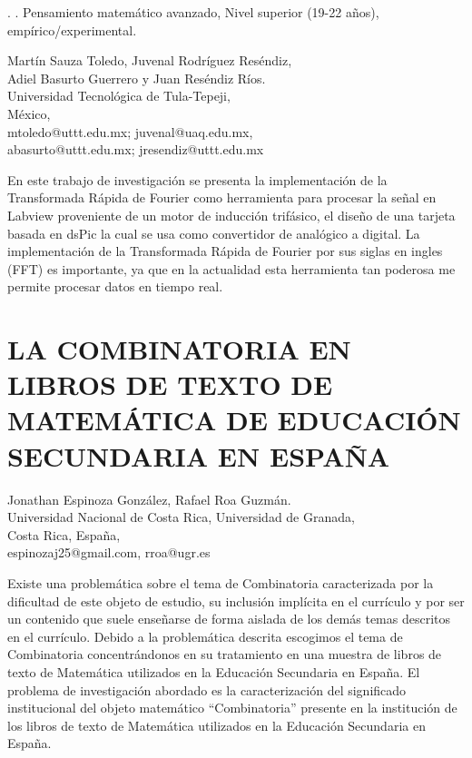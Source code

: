 . . Pensamiento matemático avanzado, Nivel superior (19-22 años),
empírico/experimental.\begin{datos}
Martín Sauza Toledo, Juvenal Rodríguez Reséndiz,\\
Adiel Basurto Guerrero y Juan Reséndiz Ríos.\\
Universidad Tecnológica de Tula-Tepeji,\\
México,\\
\hfill  mtoledo@uttt.edu.mx; juvenal@uaq.edu.mx,\\
\hfill abasurto@uttt.edu.mx; jresendiz@uttt.edu.mx
\end{datos}

En este trabajo de investigación se presenta la implementación de
la Transformada Rápida de Fourier como herramienta para procesar la
señal en Labview proveniente de un motor de inducción trifásico, el
diseño de una tarjeta basada en dsPic la cual se usa como convertidor
de analógico a digital. La implementación de la Transformada Rápida
de Fourier por sus siglas en ingles (FFT) es importante, ya que en
la actualidad esta herramienta tan poderosa me permite procesar datos
en tiempo real. 


\section{LA COMBINATORIA EN LIBROS DE TEXTO DE MATEMÁTICA DE EDUCACIÓN SECUNDARIA
EN ESPAÑA}

\begin{datos}
Jonathan Espinoza González, Rafael Roa Guzmán.\\
Universidad Nacional de Costa Rica, Universidad de Granada,\\
Costa Rica, España,\\
\hfill  espinozaj25@gmail.com, rroa@ugr.es
\end{datos}

Existe una problemática sobre el tema de Combinatoria caracterizada
por la dificultad de este objeto de estudio, su inclusión implícita
en el currículo y por ser un contenido que suele enseñarse de forma
aislada de los demás temas descritos en el currículo. Debido a la
problemática descrita escogimos el tema de Combinatoria concentrándonos
en su tratamiento en una muestra de libros de texto de Matemática
utilizados en la Educación Secundaria en España. El problema de investigación
abordado es la caracterización del significado institucional del objeto
matemático “Combinatoria” presente en la institución de los libros
de texto de Matemática utilizados en la Educación Secundaria en España. 


